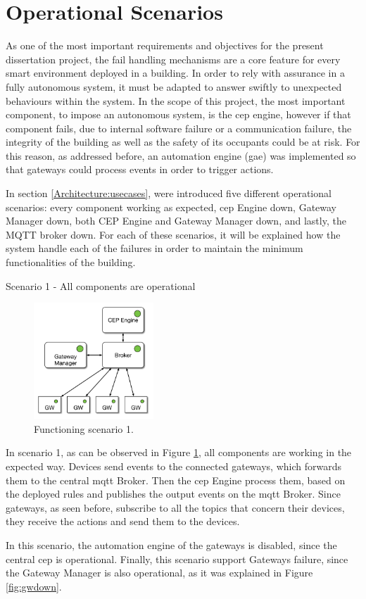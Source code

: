 \section{Operational Scenarios}
\label{implementation:scenarios}

As one of the most important requirements and objectives for the present dissertation project, the fail handling mechanisms are a core feature for every smart environment deployed in a building. In order to rely with assurance in a fully autonomous system, it must be adapted to answer swiftly to unexpected behaviours within the system. In the scope of this project, the most important component, to impose an autonomous system, is the \ac{cep} engine, however if that component fails, due to internal software failure or a communication failure, the integrity of the building as well as the safety of its occupants could be at risk. For this reason, as addressed before, an automation engine (\ac{gae}) was implemented so that gateways could process events in order to trigger actions.

In section \ref{Architecture:usecases}, were introduced five different operational scenarios: every component working as expected, \ac{cep} Engine down, Gateway Manager down, both CEP Engine and Gateway Manager down, and lastly, the MQTT broker down. For each of these scenarios, it will be explained how the system handle each of the failures in order to maintain the minimum functionalities of the building. 

\begin{Paragraph}{Scenario 1 - All components are operational}
\begin{figure}[H]
	\centering
	\includegraphics[width=0.4\textwidth]{figures/fs1.png}
	\caption{Functioning scenario 1.}
	\label{fig:fs1}
\end{figure}

In scenario 1, as can be observed in Figure \ref{fig:fs1}, all components are working in the expected way. Devices send events to the connected gateways, which forwards them to the central \ac{mqtt} Broker. Then the \ac{cep} Engine process them, based on the deployed rules and publishes the output events on the \ac{mqtt} Broker. Since gateways, as seen before, subscribe to all the topics that concern their devices, they receive the actions and send them to the devices.

In this scenario, the automation engine of the gateways is disabled, since the central \ac{cep} is operational. Finally, this scenario support Gateways failure, since the Gateway Manager is also operational, as it was explained in Figure \ref{fig:gwdown}.

\end{Paragraph}

